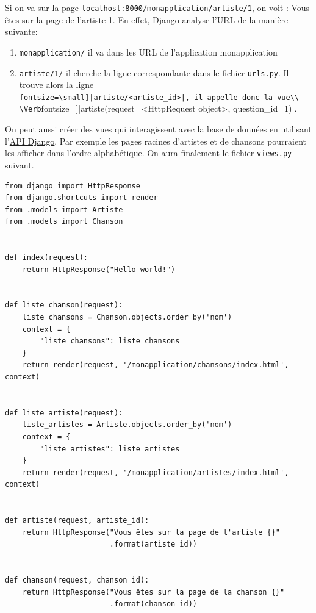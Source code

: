 \documentclass[a4paper, 10pt]{article}
\begin{document}
Si on va sur la page \texttt{localhost:8000/monapplication/artiste/1}, on voit : \og Vous êtes sur la page de l'artiste 1\fg{}. En effet, Django analyse l'URL de la manière suivante:
\begin{enumerate}
	\item \texttt{monapplication/} il va dans les URL de l’application monapplication
	\item \texttt{artiste/1/} il cherche la ligne correspondante dans le fichier \texttt{urls.py}. Il trouve alors la ligne\\ \Verb[fontsize=\small]|artiste/<artiste_id>|, il appelle donc la vue\\ \Verb[fontsize=\small]|artiste(request=<HttpRequest object>, question_id=1)|.
\end{enumerate}

On peut aussi créer des vues qui interagissent avec la base de données en utilisant l'\href{https://docs.djangoproject.com/fr/2.0/topics/db/queries/}{API Django}. Par exemple les pages racines d'artistes et de chansons pourraient les afficher dans l'ordre alphabétique. On aura finalement le fichier \texttt{views.py} suivant.

\begin{verbatim}
from django import HttpResponse
from django.shortcuts import render
from .models import Artiste
from .models import Chanson


def index(request):
    return HttpResponse("Hello world!")


def liste_chanson(request):
    liste_chansons = Chanson.objects.order_by('nom')
    context = {
        "liste_chansons": liste_chansons
    }
    return render(request, '/monapplication/chansons/index.html', context)


def liste_artiste(request):
    liste_artistes = Artiste.objects.order_by('nom')
    context = {
        "liste_artistes": liste_artistes
    }
    return render(request, '/monapplication/artistes/index.html', context)


def artiste(request, artiste_id):
    return HttpResponse("Vous êtes sur la page de l'artiste {}"
                        .format(artiste_id))


def chanson(request, chanson_id):
    return HttpResponse("Vous êtes sur la page de la chanson {}"
                        .format(chanson_id))

\end{verbatim}
\end{document}
